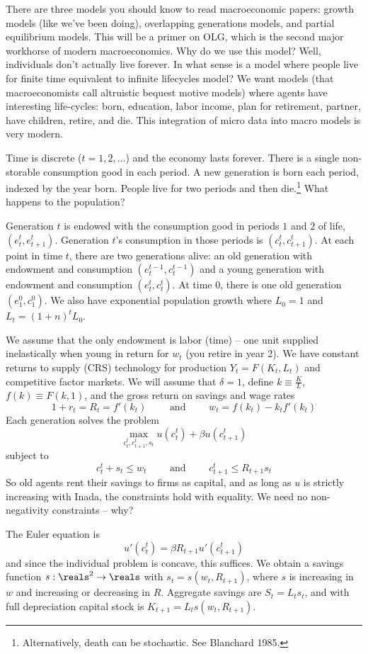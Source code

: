 \documentclass[10pt]{article}
\begin{document}
There are three models you should know to read macroeconomic papers: growth models (like we've been doing), overlapping generations models, and partial equilibrium models. This will be a primer on OLG, which is the second major workhorse of modern macroeconomics. Why do we use this model? Well, individuals don't actually live forever. In what sense is a model where people live for finite time equivalent to infinite lifecycles model? We want models (that macroeconomists call altruistic bequest motive models) where agents have interesting life-cycles: born, education, labor income, plan for retirement, partner, have children, retire, and die. This integration of micro data into macro models is very modern.

\begin{model}
	 Time is discrete ($t = 1,2,\dots$) and the economy lasts forever. There is a single non-storable consumption good in each period. A new generation is born each period, indexed by the year born. People live for two periods and then die.\footnote{Alternatively, death can be stochastic. See Blanchard 1985.} What happens to the population?
	
	Generation $t$ is endowed with the consumption good in periods $1$ and $2$ of life, $(e_t^t,e_{t+1}^t)$. Generation $t$'s consumption in those periods is $(c^t_t,c^t_{t+1})$. At each point in time $t$, there are two generations alive: an old generation with endowment and consumption $(e^{t-1}_t,c^{t-1}_t)$ and a young generation with endowment and consumption $(e^t_t,c^t_t)$. At time 0, there is one old generation $(e^0_1,c^0_1)$. We also have exponential population growth where $L_0 = 1$ and $L_t = (1+n)^tL_0$.
	
	We assume that the only endowment is labor (time) -- one unit supplied inelastically when young in return for $w_t$ (\ie you retire in year 2). We have constant returns to supply (CRS) technology for production $Y_t = F(K_t,L_t)$ and competitive factor markets. We will assume that $\delta = 1$, define $k \equiv \frac{K}{L}$, $f(k) \equiv F(k,1)$, and the gross return on savings and wage rates \[1+r_t = R_t = f'(k_t) \qquad \text{ and } \qquad w_t = f(k_t) - k_tf'(k_t)\]Each generation solves the problem \[\max_{c_t^t,c^t_{t+1},s_t}u(c_t^t) + \beta u(c_{t+1}^t)\]subject to \[c_t^t + s_t \le w_t \qquad \text{ and } \qquad c^t_{t+1} \le R_{t+1}s_t\] So old agents rent their savings to firms as capital, and as long as $u$ is strictly increasing with Inada, the constraints hold with equality. We need no non-negativity constraints -- why?
	
	The Euler equation is \[u'(c_t^t) = \beta R_{t+1}u'(c_{t+1}^t)\]and since the individual problem is concave, this suffices. We obtain a savings function $s: \reals^2 \to \reals$ with $s_t = s(w_t,R_{t+1})$, where $s$ is increasing in $w$ and increasing or decreasing in $R$. Aggregate savings are $S_t = L_ts_t$, and with full depreciation capital stock is $K_{t+1} = L_ts(w_t,R_{t+1})$.
\end{model}
\end{document}
